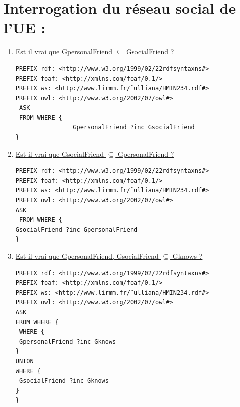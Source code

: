 \documentclass[12pt,a4paper]{article}
\begin{document}
    \section{Interrogation du réseau social de l'UE :}
    \begin{justify}
        \begin{enumerate}
            \item \underline{Est il vrai que GpersonalFriend $\subseteq$ GsocialFriend ?}
            \begin{verbatim}
PREFIX rdf: <http://www.w3.org/1999/02/22rdfsyntaxns#>
PREFIX foaf: <http://xmlns.com/foaf/0.1/> 
PREFIX ws: <http://www.lirmm.fr/˜ulliana/HMIN234.rdf#> 
PREFIX owl: <http://www.w3.org/2002/07/owl#>
 ASK
 FROM WHERE {
                GpersonalFriend ?inc GsocialFriend 
}

            \end{verbatim}
            \item \underline{Est il vrai que GsocialFriend $\subseteq$ GpersonalFriend ?}
            \begin{verbatim}
PREFIX rdf: <http://www.w3.org/1999/02/22rdfsyntaxns#>
PREFIX foaf: <http://xmlns.com/foaf/0.1/> 
PREFIX ws: <http://www.lirmm.fr/˜ulliana/HMIN234.rdf#> 
PREFIX owl: <http://www.w3.org/2002/07/owl#>
ASK
 FROM WHERE { 
GsocialFriend ?inc GpersonalFriend 
}
            \end{verbatim}
            \item \underline{Est il vrai que GpersonalFriend, GsocialFriend $\subseteq$ Gknows ?}
            \begin{verbatim}
PREFIX rdf: <http://www.w3.org/1999/02/22rdfsyntaxns#>
PREFIX foaf: <http://xmlns.com/foaf/0.1/>
PREFIX ws: <http://www.lirmm.fr/˜ulliana/HMIN234.rdf#>
PREFIX owl: <http://www.w3.org/2002/07/owl#>
ASK
FROM WHERE {
 WHERE {
 GpersonalFriend ?inc Gknows
}
UNION
WHERE {
 GsocialFriend ?inc Gknows
}
}

            \end{verbatim}
        \end{enumerate}
    \end{justify}
\end{document}
